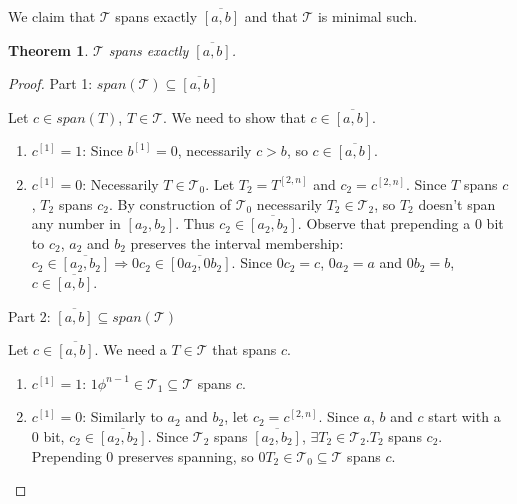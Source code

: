 \documentclass{article}
\theoremstyle{plain}
\newtheorem{theorem}{Theorem}[subsection]
\theoremstyle{definition}
\newcommand{\interval}[2]{[#1, #2]}
\newcommand{\finterval}[2]{\overline{\interval{#1}{#2}}}
\newcommand{\bit}[2]{#1^{[#2]}}
\newcommand{\bits}[3]{#1^{\interval{#2}{#3}}}
\begin{document}
We claim that $\mathcal{T}$ spans exactly $\finterval{a}{b}$
and that $\mathcal{T}$ is minimal such. %

\begin{theorem}
$\mathcal{T}$ spans exactly $\finterval{a}{b}$.
\end{theorem}

\begin{proof}
Part 1: $span(\mathcal{T}) \subseteq \finterval{a}{b}$

Let $c \in span(T)$, $T \in \mathcal{T}$.
We need to show that $c \in \finterval{a}{b}$.

\begin{enumerate}
\item $\bit{c}{1} = 1$: Since $\bit{b}{1} = 0$, necessarily $c > b$, so $c \in \finterval{a}{b}$.
\item $\bit{c}{1} = 0$: Necessarily $T \in \mathcal{T}_0$.
Let $T_2 = \bits{T}{2}{n}$ and $c_2 = \bits{c}{2}{n}$.
Since $T$ spans $c$, $T_2$ spans $c_2$.
By construction of $\mathcal{T}_0$ necessarily $T_2 \in \mathcal{T}_2$,
so $T_2$ doesn't span any number in $\interval{a_2}{b_2}$.
Thus $c_2 \in \finterval{a_2}{b_2}$.
Observe that prepending a $0$ bit to $c_2$, $a_2$ and $b_2$ preserves the interval membership:
$c_2 \in \finterval{a_2}{b_2} \Rightarrow 0 c_2 \in \finterval{0 a_2}{0 b_2}$.
Since $0 c_2 = c$, $0 a_2 = a$ and $0 b_2 = b$,
$c \in \finterval{a}{b}$.
\end{enumerate}

Part 2: $\finterval{a}{b} \subseteq span(\mathcal{T})$

Let $c \in \finterval{a}{b}$.
We need a $T \in \mathcal{T}$ that spans $c$.

\begin{enumerate}
\item $\bit{c}{1} = 1$: $1 \phi^{n-1} \in \mathcal{T}_1 \subseteq \mathcal{T}$ spans $c$.
\item $\bit{c}{1} = 0$:
Similarly to $a_2$ and $b_2$, let $c_2 = \bits{c}{2}{n}$.
Since $a$, $b$ and $c$ start with a $0$ bit,
$c_2 \in \finterval{a_2}{b_2}$.
Since $\mathcal{T}_2$ spans $\finterval{a_2}{b_2}$,
$\exists T_2 \in \mathcal{T}_2 . T_2$ spans $c_2$.
Prepending $0$ preserves spanning,
so $0 T_2 \in \mathcal{T}_0 \subseteq \mathcal{T}$ spans $c$.
\end{enumerate}
\end{proof}
\end{document}

